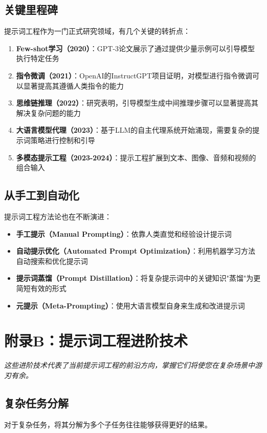 \documentclass[12pt]{ctexart}
\newcommand{\chapternote}[1]{\vspace{-0.3cm}\par\noindent\textit{\small #1}\vspace{0.3cm}}
\begin{document}
\subsection{关键里程碑}
提示词工程作为一门正式研究领域，有几个关键的转折点：

\begin{enumerate}
  \item \textbf{Few-shot学习（2020）}：GPT-3论文展示了通过提供少量示例可以引导模型执行特定任务
  \item \textbf{指令微调（2021）}：OpenAI的InstructGPT项目证明，对模型进行指令微调可以显著提高其遵循人类指令的能力
  \item \textbf{思维链推理（2022）}：研究表明，引导模型生成中间推理步骤可以显著提高其解决复杂问题的能力
  \item \textbf{大语言模型代理（2023）}：基于LLM的自主代理系统开始涌现，需要复杂的提示词策略进行控制和引导
  \item \textbf{多模态提示工程（2023-2024）}：提示工程扩展到文本、图像、音频和视频的组合输入
\end{enumerate}

\subsection{从手工到自动化}
提示词工程方法论也在不断演进：
\begin{itemize}
  \item \textbf{手工提示（Manual Prompting）}：依靠人类直觉和经验设计提示词
  \item \textbf{自动提示优化（Automated Prompt Optimization）}：利用机器学习方法自动搜索和优化提示词
  \item \textbf{提示词蒸馏（Prompt Distillation）}：将复杂提示词中的关键知识"蒸馏"为更简短有效的形式
  \item \textbf{元提示（Meta-Prompting）}：使用大语言模型自身来生成和改进提示词
\end{itemize}

\section{附录B：提示词工程进阶技术}
\chapternote{这些进阶技术代表了当前提示词工程的前沿方向，掌握它们将使您在复杂场景中游刃有余。}

\subsection{复杂任务分解}
对于复杂任务，将其分解为多个子任务往往能够获得更好的结果。
\end{document}
